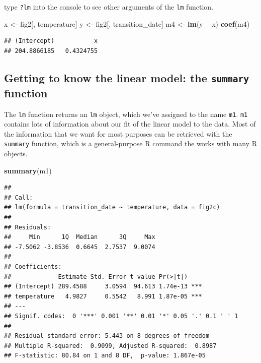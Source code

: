 \documentclass[]{book}
\newenvironment{Shaded}{\begin{snugshade}}{\end{snugshade}}
\newcommand{\KeywordTok}[1]{\textcolor[rgb]{0.13,0.29,0.53}{\textbf{#1}}}
\newcommand{\NormalTok}[1]{#1}
\newcommand{\OperatorTok}[1]{\textcolor[rgb]{0.81,0.36,0.00}{\textbf{#1}}}
\newcommand{\StringTok}[1]{\textcolor[rgb]{0.31,0.60,0.02}{#1}}
\begin{document}
type \texttt{?lm} into the console to see other arguments of the \texttt{lm} function.

\begin{Shaded}
\begin{Highlighting}[]
\NormalTok{x <-}\StringTok{ }\NormalTok{fig2[, temperature]}
\NormalTok{y <-}\StringTok{ }\NormalTok{fig2[, transition_date]}
\NormalTok{m4 <-}\StringTok{ }\KeywordTok{lm}\NormalTok{(y }\OperatorTok{~}\StringTok{ }\NormalTok{x)}
\KeywordTok{coef}\NormalTok{(m4)}
\end{Highlighting}
\end{Shaded}

\begin{verbatim}
## (Intercept)           x 
## 204.8866185   0.4324755
\end{verbatim}

\hypertarget{getting-to-know-the-linear-model-the-summary-function}{%
\subsection{\texorpdfstring{Getting to know the linear model: the \texttt{summary} function}{Getting to know the linear model: the summary function}}\label{getting-to-know-the-linear-model-the-summary-function}}

The \texttt{lm} function returns an \texttt{lm} object, which we've assigned to the name \texttt{m1}. \texttt{m1} contains lots of information about our fit of the linear model to the data. Most of the information that we want for most purposes can be retrieved with the \texttt{summary} function, which is a general-purpose R command the works with many R objects.

\begin{Shaded}
\begin{Highlighting}[]
\KeywordTok{summary}\NormalTok{(m1)}
\end{Highlighting}
\end{Shaded}

\begin{verbatim}
## 
## Call:
## lm(formula = transition_date ~ temperature, data = fig2c)
## 
## Residuals:
##     Min      1Q  Median      3Q     Max 
## -7.5062 -3.8536  0.6645  2.7537  9.0074 
## 
## Coefficients:
##             Estimate Std. Error t value Pr(>|t|)    
## (Intercept) 289.4588     3.0594  94.613 1.74e-13 ***
## temperature   4.9827     0.5542   8.991 1.87e-05 ***
## ---
## Signif. codes:  0 '***' 0.001 '**' 0.01 '*' 0.05 '.' 0.1 ' ' 1
## 
## Residual standard error: 5.443 on 8 degrees of freedom
## Multiple R-squared:  0.9099, Adjusted R-squared:  0.8987 
## F-statistic: 80.84 on 1 and 8 DF,  p-value: 1.867e-05
\end{verbatim}
\end{document}
